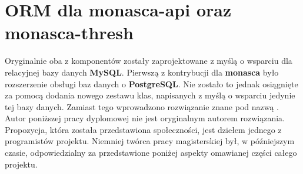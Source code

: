 \section{ORM dla monasca-api oraz monasca-thresh}
\label{chapter:application:own_work:orm}

Oryginalnie oba z komponentów zostały zaprojektowane z myślą o wsparciu dla relacyjnej bazy danych \textbf{MySQL}. 
Pierwszą z kontrybucji dla \textbf{monasca} było rozszerzenie obsługi baz danych o \textbf{PostgreSQL}. Nie zostało
to jednak osiągnięte za pomocą dodania nowego zestawu klas, napisanych z myślą o wsparciu jedynie tej bazy danych. Zamiast
tego wprowadzono rozwiązanie znane pod nazwą .
Autor poniższej pracy dyplomowej nie jest oryginalnym autorem rozwiązania. Propozycja, która została
przedstawiona społeczności, jest dziełem jednego z programistów projektu. Niemniej twórca pracy magisterskiej był, w późniejszym czasie,
odpowiedzialny za przedstawione poniżej aspekty omawianej części całego projektu.

